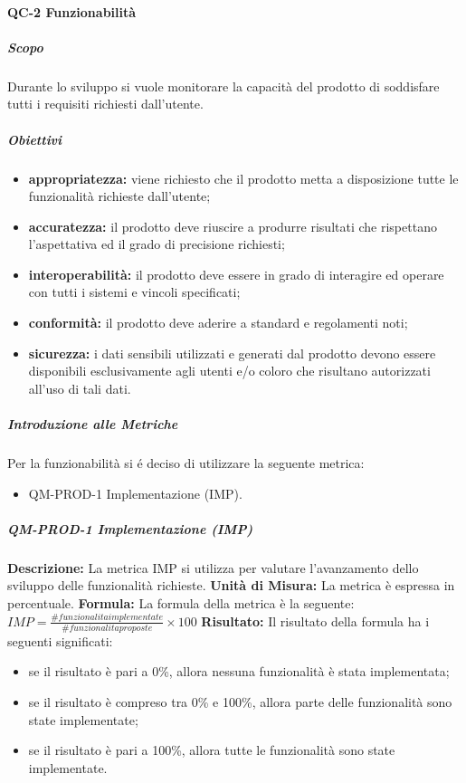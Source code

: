 		\paragraph{QC-2 Funzionabilità}
			\subparagraph{Scopo}
				Durante lo sviluppo si vuole monitorare la capacità del prodotto di soddisfare tutti i requisiti richiesti dall'utente.
			\subparagraph{Obiettivi}
				\begin{itemize}
					\item \textbf{appropriatezza:} viene richiesto che il prodotto metta a disposizione tutte le funzionalità richieste dall'utente;
					\item \textbf{accuratezza:} il prodotto deve riuscire a produrre risultati che rispettano l'aspettativa ed il grado di precisione richiesti;
					\item \textbf{interoperabilità:} il prodotto deve essere in grado di interagire ed operare con tutti i sistemi e vincoli specificati;
					\item \textbf{conformità:} il prodotto deve aderire a standard e regolamenti noti;
					\item \textbf{sicurezza:} i dati sensibili utilizzati e generati dal prodotto devono essere disponibili esclusivamente agli utenti e/o coloro che risultano autorizzati all'uso di tali dati.
				\end{itemize}	
			\subparagraph{Introduzione alle Metriche}
				Per la funzionabilità si é deciso di utilizzare la seguente metrica:
				\begin{itemize}
					\item QM-PROD-1 Implementazione (IMP).
				\end{itemize}
			\subparagraph{QM-PROD-1 Implementazione (IMP)}
				\textbf{Descrizione: }
					La metrica IMP si utilizza per valutare l'avanzamento dello sviluppo delle funzionalità richieste.
				\textbf{Unità di Misura: }
					La metrica è espressa in percentuale.
				\textbf{Formula: }
					La formula della metrica è la seguente:
					\(
						IMP = \frac{\# funzionalita implementate}{\# funzionalita proposte}\times100
					\)
				\textbf{Risultato: }
					Il risultato della formula ha i seguenti significati:
					\begin{itemize}
						\item se il risultato è pari a 0\%, allora nessuna funzionalità è stata implementata;
						\item se il risultato è compreso tra 0\% e 100\%, allora parte delle funzionalità sono state implementate;
						\item se il risultato è pari a 100\%, allora tutte le funzionalità sono state implementate.
					\end{itemize}

